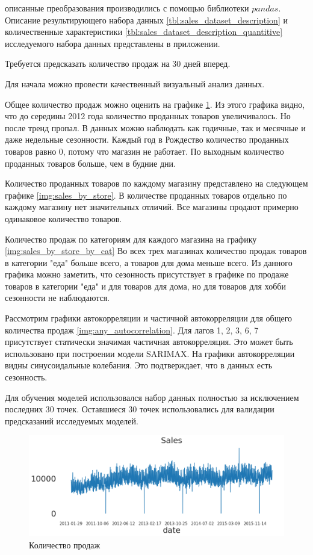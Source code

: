 \noindent описанные преобразования производились с помощью библиотеки $ pandas $.
Описание результирующего набора данных \ref{tbl:sales_dataset_description}
и количественные характеристики \ref{tbl:sales_dataset_description_quantitive}
исследуемого набора данных представлены в приложении.

Требуется предсказать количество продаж на 30 дней вперед.

Для начала можно провести качественный визуальный анализ данных.

Общее количество продаж можно оценить на графике \ref{img:all_sales}.
Из этого графика видно, что до середины 2012 года количество проданных
товаров увеличивалось. Но после тренд пропал. В данных можно наблюдать
как годичные, так и месячные и даже недельные сезонности. Каждый год
в Рождество количество проданных товаров равно 0, потому что магазин не работает.
По выходным количество проданных товаров больше, чем в будние дни.

Количество проданных товаров по каждому магазину представлено на следующем графике \ref{img:sales_by_store}.
В количестве проданных товаров отдельно по каждому магазину нет значительных отличий.
Все магазины продают примерно одинаковое количество товаров.

Количество продаж по категориям для каждого магазина на графику \ref{img:sales_by_store_by_cat}
Во всех трех магазинах количество продаж товаров в категории "еда" больше всего,
а товаров для дома меньше всего. Из данного графика можно заметить, что сезонность
присутствует в графике по продаже товаров в категории "еда" и для товаров для дома, но
для товаров для хобби сезонности не наблюдаются.

Рассмотрим графики автокорреляции и частичной автокорреляции для общего количества продаж
\ref{img:any_autocorrelation}.
Для лагов 1, 2, 3, 6, 7 присутствует статически значимая частичная автокорреляция.
Это может быть использовано при построении модели SARIMAX.
На графики автокорреляции видны синусоидальные колебания. Это подтверждает,
что в данных есть сезонность.

Для обучения моделей использовался набор данных полностью за
исключением последних 30 точек. Оставшиеся 30 точек использовались для
валидации предсказаний исследуемых моделей.

\def\figurename{Рис}
\begin{figure}[t]
	\centering
	\includegraphics[width=0.9\columnwidth]{./img/all_sales.png}
	\caption{Количество продаж}
	\label{img:all_sales}
\end{figure}


